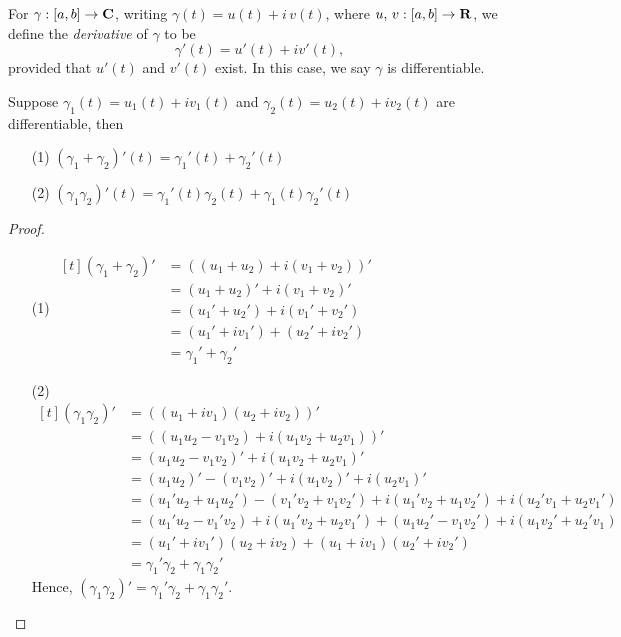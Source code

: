 \vspace*{1em}

\begin{definition}
For $\gamma:[a,b] \to \mathbf C$, writing $\gamma(t) = u(t) + i\,v(t)$, where $u,\,v:[a,b] \to \mathbf R$, we define the \emph{derivative} of $\gamma$ to be
\[\gamma'(t) = u'(t) + iv'(t),\]
provided that $u'(t)$ and $v'(t)$ exist. In this case, we say $\gamma$ is differentiable.
\end{definition}

\vspace*{1em}

\begin{proposition}
Suppose $\gamma_1(t) = u_1(t) + iv_1(t)$ and $\gamma_2(t) = u_2(t) + iv_2(t)$ are differentiable, then
\begin{itemize}
\item[(1)] $(\gamma_1 + \gamma_2)'(t) = \gamma_1'(t) + \gamma_2'(t)$
\item[(2)] $(\gamma_1\gamma_2)'(t) = \gamma_1'(t)\gamma_2(t) + \gamma_1(t)\gamma_2'(t)$
\end{itemize}
\end{proposition}
\begin{proof}\hfill
\begin{itemize}
\item[(1)] 
$\begin{aligned}[t]
(\gamma_1 + \gamma_2)' &=  ((u_1 + u_2) + i(v_1 + v_2))'\\[0.5em]
&= (u_1 + u_2)' + i(v_1 + v_2)'\\[0.5em]
&= (u_1' + u_2') + i(v_1' + v_2')\\[0.5em]
&= (u_1' + iv_1') + (u_2' + iv_2')\\[0.5em]
&= \gamma_1' + \gamma_2'
\end{aligned}$

\item[(2)] 
$\begin{aligned}[t]
(\gamma_1\gamma_2)' &=  ((u_1 + iv_1)(u_2 + iv_2))'\\[0.5em]
&=  ((u_1u_2 - v_1v_2) + i(u_1v_2 + u_2v_1))'\\[0.5em]
&= (u_1u_2 - v_1v_2)' + i(u_1v_2 + u_2v_1)'\\[0.5em]
&= (u_1u_2)' - (v_1v_2)' + i(u_1v_2)' + i(u_2v_1)'\\[0.5em]
&= (u_1'u_2 + u_1u_2') - (v_1'v_2 + v_1v_2') + i(u_1'v_2 + u_1v_2') + i(u_2'v_1 + u_2v_1')\\[0.5em]
&= (u_1'u_2 - v_1'v_2) + i(u_1'v_2 + u_2v_1') + (u_1u_2' - v_1v_2') + i(u_1v_2' + u_2'v_1)\\[0.5em]
&= (u_1' + iv_1')(u_2 + iv_2) + (u_1 + iv_1)(u_2' + iv_2')\\[0.5em]
&= \gamma_1'\gamma_2 + \gamma_1\gamma_2'
\end{aligned}$\\[1em]
Hence, $(\gamma_1\gamma_2)' = \gamma_1'\gamma_2 + \gamma_1\gamma_2'$.
\end{itemize}
\vspace*{-\baselineskip}
\end{proof}

